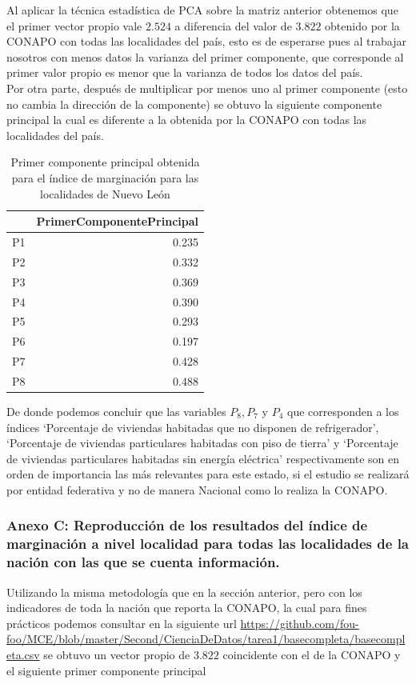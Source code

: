\documentclass[paper=letter, fontsize=11pt]{scrartcl}
\numberwithin{equation}{section} %
\numberwithin{figure}{section} %
\numberwithin{table}{section} %
\begin{document}
\begin{enumerate}
\begin{enumerate}
\begin{table}[H]
\end{table}
Al aplicar la técnica estadística de PCA sobre la matriz anterior obtenemos que el primer vector propio vale $ 2.524$ a diferencia del valor de $3.822$ obtenido por la CONAPO con todas las localidades del país, esto es de esperarse pues al trabajar nosotros con menos datos la varianza del primer componente, que corresponde al primer valor propio es menor que la varianza de todos los datos del país.\\
Por otra parte, después de multiplicar por menos uno al primer componente (esto no cambia la dirección de la componente) se obtuvo la siguiente componente principal la cual es diferente a la obtenida por la CONAPO con todas las localidades del país.

\begin{table}[ht]
\centering
\begin{tabular}{rr}
  \hline
 &     PrimerComponentePrincipal\\
     \hline
P1 &                     0.235\\
P2  &                    0.332\\
P3   &                   0.369\\
P4    &                  0.390\\
P5     &                 0.293\\
P6      &                0.197\\
P7       &               0.428\\
P8        &              0.488 \\
   \hline
\end{tabular}
\caption{Primer componente principal obtenida para el índice de marginación para las localidades de Nuevo León}
\end{table}
 
De donde podemos concluir que las variables $P_8,P_7 $ y $  P_4$ que corresponden a los índices ‘Porcentaje de viviendas habitadas que no disponen de refrigerador’, ‘Porcentaje de viviendas particulares habitadas con piso de tierra’ y ‘Porcentaje de viviendas particulares habitadas sin energía eléctrica’ respectivamente son en orden de importancia las más relevantes para este estado, si el estudio se realizará por entidad federativa y no de manera Nacional como lo realiza la CONAPO. 





\subsubsection{Anexo C: Reproducción de los resultados del índice de marginación a nivel localidad para todas las localidades  de la nación con las que se cuenta información.}
Utilizando la misma metodología que en la sección anterior, pero con los indicadores de toda la nación que reporta la CONAPO, la cual para fines prácticos podemos consultar en la siguiente url \url{https://github.com/fou-foo/MCE/blob/master/Second/CienciaDeDatos/tarea1/basecompleta/basecompleta.csv} se obtuvo un vector propio de $3.822$ coincidente con el de la CONAPO y el siguiente primer componente principal 


\end{enumerate}
\end{enumerate}
\end{document}
